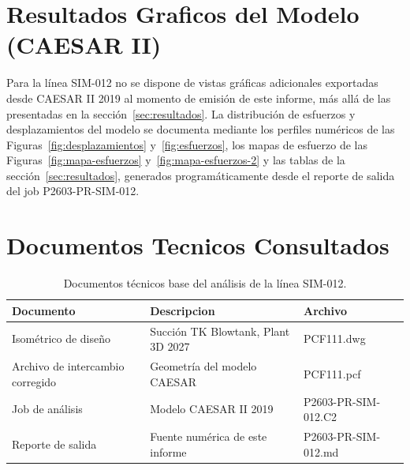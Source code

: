 \appendix
\section{Resultados Graficos del Modelo (CAESAR II)}
\label{appendix:graficos}

Para la l\'{i}nea SIM-012 no se dispone de vistas gr\'{a}ficas adicionales
exportadas desde CAESAR II 2019 al momento de emisi\'{o}n de este informe,
m\'{a}s all\'{a} de las presentadas en la secci\'{o}n~\ref{sec:resultados}. La
distribuci\'{o}n de esfuerzos y desplazamientos del modelo se documenta
mediante los perfiles num\'{e}ricos de las Figuras~\ref{fig:desplazamientos}
y~\ref{fig:esfuerzos}, los mapas de esfuerzo de las
Figuras~\ref{fig:mapa-esfuerzos} y~\ref{fig:mapa-esfuerzos-2} y las tablas de
la secci\'{o}n~\ref{sec:resultados}, generados program\'{a}ticamente desde el
reporte de salida del job P2603-PR-SIM-012.

\section{Documentos Tecnicos Consultados}
\label{appendix:documentos}

\begin{table}[htbp]
    \centering
    \small
    \caption{Documentos t\'{e}cnicos base del an\'{a}lisis de la l\'{i}nea SIM-012.}
    \label{tab:planos}
    \begin{tabular}{@{}lll@{}}
        \toprule
        \textbf{Documento} & \textbf{Descripcion} & \textbf{Archivo} \\
        \midrule
        Isom\'{e}trico de dise\~{n}o & Succión TK Blowtank, Plant 3D 2027 & PCF111.dwg \\
        Archivo de intercambio corregido & Geometr\'{i}a del modelo CAESAR & PCF111.pcf \\
        Job de an\'{a}lisis & Modelo CAESAR II 2019 & P2603-PR-SIM-012.C2 \\
        Reporte de salida & Fuente num\'{e}rica de este informe & P2603-PR-SIM-012.md \\
        \bottomrule
    \end{tabular}
\end{table}
